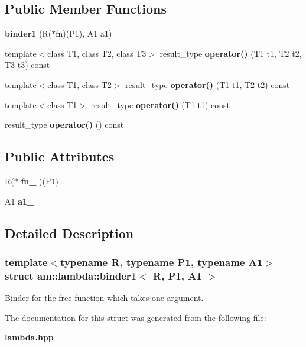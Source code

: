 \subsection*{Public Member Functions}
\begin{CompactItemize}
\item 
\textbf{binder1} (R($\ast$fn)(P1), A1 a1)\label{structam_1_1lambda_1_1binder1_c2108aaef80abd01a31bce2a0e38c6a3}

\item 
template$<$class T1, class T2, class T3$>$ result\_\-type \textbf{operator()} (T1 t1, T2 t2, T3 t3) const \label{structam_1_1lambda_1_1binder1_480bdebf86834c60e81bd98e82ae1eb9}

\item 
template$<$class T1, class T2$>$ result\_\-type \textbf{operator()} (T1 t1, T2 t2) const\label{structam_1_1lambda_1_1binder1_e3b600bffd6e5564189362b838a5e341}

\item 
template$<$class T1$>$ result\_\-type \textbf{operator()} (T1 t1) const \label{structam_1_1lambda_1_1binder1_2f055604a17c90630328a6fe236387d4}

\item 
result\_\-type \textbf{operator()} () const\label{structam_1_1lambda_1_1binder1_1238e7e2aec16f220493f12e385c5808}

\end{CompactItemize}
\subsection*{Public Attributes}
\begin{CompactItemize}
\item 
R($\ast$ \textbf{fn\_\-} )(P1)\label{structam_1_1lambda_1_1binder1_54e5220f72cf932262c966ed61ba42fb}

\item 
A1 \textbf{a1\_\-}\label{structam_1_1lambda_1_1binder1_e83629cd1c47a8a452918e8b6bc12845}

\end{CompactItemize}


\subsection{Detailed Description}
\subsubsection*{template$<$typename R, typename P1, typename A1$>$ struct am::lambda::binder1$<$ R, P1, A1 $>$}

Binder for the free function which takes one argument. 



The documentation for this struct was generated from the following file:\begin{CompactItemize}
\item 
{\bf lambda.hpp}\end{CompactItemize}
